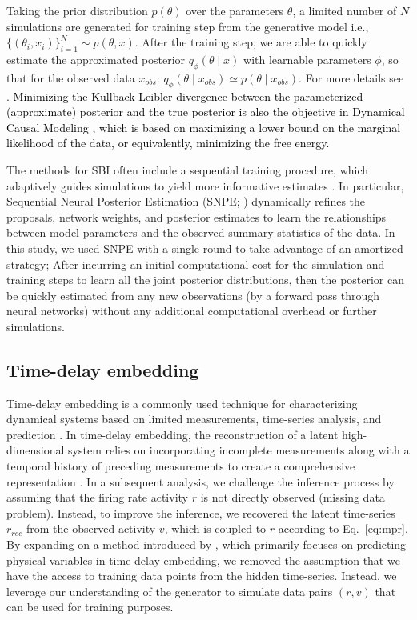 \documentclass[12pt]{article}
\begin{document}
Taking the prior distribution $p(\theta)$ over the parameters $\theta$, a limited number of $N$ simulations are generated for training step from the generative model i.e.,  $\{(\theta_i, x_i)\}_{i=1}^{N} \sim p(\theta, x)$. After the training step, we are able to quickly estimate the approximated posterior $q_{\phi}(\theta \mid x)$ with learnable parameters $\phi$, so that for the observed data $x_{obs}$: $q_{\phi}(\theta \mid x_{obs}) \simeq p(\theta \mid x_{obs})$. For more details see \cite{Goncalves2020, Hashemi2023}. 
\textcolor{black}{Minimizing the Kullback-Leibler divergence between the parameterized (approximate) posterior and the true posterior is also the objective in Dynamical Causal Modeling \citep{Friston2003, Blei2017}, which is based on maximizing a lower bound on the marginal likelihood of the data, or equivalently, minimizing the free energy.}

The methods for SBI often include a sequential training procedure, which adaptively guides simulations to yield more informative estimates \citep{Papamakarios2019b, Lueckmann2019, Durkan2020, Wiqvist2021, Deistler2022}. In particular, Sequential Neural Posterior Estimation (SNPE; \cite{Greenberg2019, Goncalves2020})  dynamically refines the proposals, network weights, and posterior estimates to learn the relationships between model parameters and the observed summary statistics of the data. In this study, we used SNPE with a single round to take advantage of an amortized strategy; After incurring an initial computational cost for the simulation and training steps to learn all the joint posterior distributions, then the posterior can be quickly estimated from any new observations (by a forward pass through neural networks)  without any additional computational overhead or further simulations.



\subsection{Time-delay embedding}

Time-delay embedding is a commonly used technique for characterizing dynamical systems based on limited measurements, time-series analysis, and prediction \citep{Takens2006}. In time-delay embedding, the reconstruction of a latent high-dimensional system relies on incorporating incomplete measurements along with a temporal history of preceding measurements to create a comprehensive representation \citep{Kennel1992, Hirsh2021}.
In a subsequent analysis, we challenge the inference process by assuming that the firing rate activity $r$ is not directly observed (missing data problem). Instead, to improve the inference, we recovered the latent time-series $r_{rec}$ from the observed activity $v$, which is coupled to $r$ according to Eq.~\ref{eq:mpr}.
By expanding on a method introduced by \cite{Abarbanel}, which primarily focuses on predicting physical variables in time-delay embedding, we removed the assumption that we have the access to training data points from the hidden time-series. Instead, we leverage our understanding of the generator to simulate data pairs $(r, v)$ that can be used for training purposes.
\end{document}
